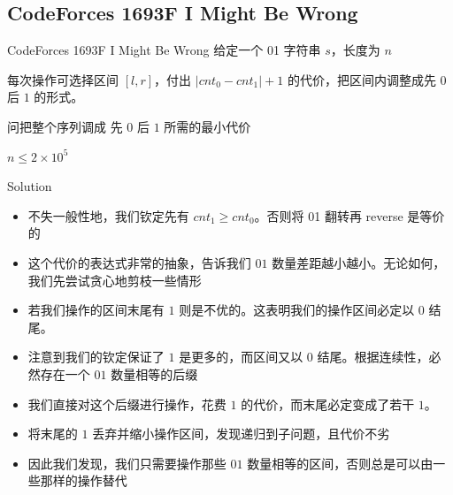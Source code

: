 ﻿\documentclass[aspectratio=169,handout]{ctexbeamer}
\begin{document}





\subsection{CodeForces 1693F I Might Be Wrong}
\begin{frame}{CodeForces 1693F I Might Be Wrong}
    给定一个 01 字符串 $s$，长度为 $n$

    每次操作可选择区间 $[l,r]$，付出 $|cnt_0-cnt_1|+1$ 的代价，把区间内调整成先 $ 0 $ 后 $ 1 $ 的形式。
    
    问把整个序列调成 先 $ 0 $ 后 $ 1 $ 所需的最小代价

$n\leq 2\times 10^5$
\end{frame}

\begin{frame}{Solution}
    \begin{itemize}
        \item 不失一般性地，我们钦定先有 $cnt_1\ge cnt_0$。否则将 01 翻转再 reverse 是等价的
        \item 这个代价的表达式非常的抽象，告诉我们 $01$ 数量差距越小越小。无论如何，我们先尝试贪心地剪枝一些情形
        \item 若我们操作的区间末尾有 $ 1 $ 则是不优的。这表明我们的操作区间必定以 $ 0 $ 结尾。
        \item 注意到我们的钦定保证了 $ 1 $ 是更多的，而区间又以 $ 0 $ 结尾。根据连续性，必然存在一个 $01$ 数量相等的后缀
        \item 我们直接对这个后缀进行操作，花费 $1$ 的代价，而末尾必定变成了若干 $ 1 $。
        \item 将末尾的 $ 1 $ 丢弃并缩小操作区间，发现递归到子问题，且代价不劣
        \item 因此我们发现，我们只需要操作那些 $01$ 数量相等的区间，否则总是可以由一些那样的操作替代
    \end{itemize}
\end{frame}
\end{document}

